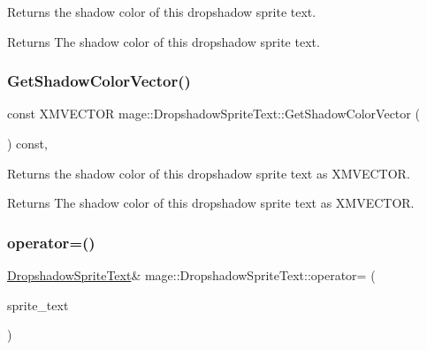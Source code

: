 Returns the shadow color of this dropshadow sprite text.

\begin{DoxyReturn}{Returns}
The shadow color of this dropshadow sprite text. 
\end{DoxyReturn}
\hypertarget{classmage_1_1_dropshadow_sprite_text_aedbd1adb15584680abebab3784905834}{}\label{classmage_1_1_dropshadow_sprite_text_aedbd1adb15584680abebab3784905834} 
\subsubsection{\texorpdfstring{Get\+Shadow\+Color\+Vector()}{GetShadowColorVector()}}
{\footnotesize\ttfamily const X\+M\+V\+E\+C\+T\+OR mage\+::\+Dropshadow\+Sprite\+Text\+::\+Get\+Shadow\+Color\+Vector (\begin{DoxyParamCaption}{ }\end{DoxyParamCaption}) const\hspace{0.3cm}{\ttfamily [private]}, {\ttfamily [noexcept]}}

Returns the shadow color of this dropshadow sprite text as {\ttfamily X\+M\+V\+E\+C\+T\+OR}.

\begin{DoxyReturn}{Returns}
The shadow color of this dropshadow sprite text as {\ttfamily X\+M\+V\+E\+C\+T\+OR}. 
\end{DoxyReturn}
\hypertarget{classmage_1_1_dropshadow_sprite_text_a83846227264396ee5b6ca44304bc404a}{}\label{classmage_1_1_dropshadow_sprite_text_a83846227264396ee5b6ca44304bc404a} 
\subsubsection{\texorpdfstring{operator=()}{operator=()}\hspace{0.1cm}{\footnotesize\ttfamily [1/2]}}
{\footnotesize\ttfamily \hyperlink{classmage_1_1_dropshadow_sprite_text}{Dropshadow\+Sprite\+Text}\& mage\+::\+Dropshadow\+Sprite\+Text\+::operator= (\begin{DoxyParamCaption}\item[{const \hyperlink{classmage_1_1_dropshadow_sprite_text}{Dropshadow\+Sprite\+Text} \&}]{sprite\+\_\+text }\end{DoxyParamCaption})\hspace{0.3cm}{\ttfamily [delete]}}

